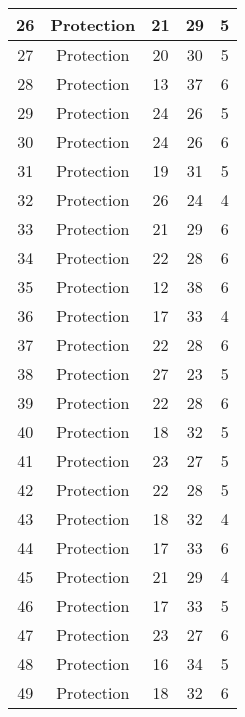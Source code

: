 \documentclass[results.tex]{subfiles}
\begin{document}
\begin{center}
\begin{tabular}{| c || c | c | c | c |}
    \hline
    26 & Protection & 21 & 29 & 5 \\ 
    \hline
    27 & Protection & 20 & 30 & 5 \\ 
    \hline
    28 & Protection & 13 & 37 & 6 \\ 
    \hline
    29 & Protection & 24 & 26 & 5 \\ 
    \hline
    30 & Protection & 24 & 26 & 6 \\ 
    \hline
    31 & Protection & 19 & 31 & 5 \\ 
    \hline
    32 & Protection & 26 & 24 & 4 \\ 
    \hline
    33 & Protection & 21 & 29 & 6 \\ 
    \hline
    34 & Protection & 22 & 28 & 6 \\ 
    \hline
    35 & Protection & 12 & 38 & 6 \\ 
    \hline
    36 & Protection & 17 & 33 & 4 \\ 
    \hline
    37 & Protection & 22 & 28 & 6 \\ 
    \hline
    38 & Protection & 27 & 23 & 5 \\ 
    \hline
    39 & Protection & 22 & 28 & 6 \\ 
    \hline
    40 & Protection & 18 & 32 & 5 \\ 
    \hline
    41 & Protection & 23 & 27 & 5 \\ 
    \hline
    42 & Protection & 22 & 28 & 5 \\ 
    \hline
    43 & Protection & 18 & 32 & 4 \\ 
    \hline
    44 & Protection & 17 & 33 & 6 \\ 
    \hline
    45 & Protection & 21 & 29 & 4 \\ 
    \hline
    46 & Protection & 17 & 33 & 5 \\ 
    \hline
    47 & Protection & 23 & 27 & 6 \\ 
    \hline
    48 & Protection & 16 & 34 & 5 \\ 
    \hline
    49 & Protection & 18 & 32 & 6 \\ 
    \hline   \end{tabular}
\end{center}
\end{document}
